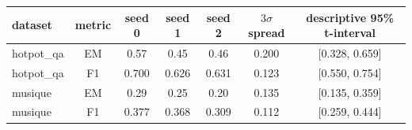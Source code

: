 \begin{tabular}{lcccccc}
\toprule
dataset & metric & seed 0 & seed 1 & seed 2 & $3\sigma$ spread & descriptive 95\% t-interval \\
\midrule
hotpot\_qa & EM & 0.57 & 0.45 & 0.46 & 0.200 & [0.328, 0.659] \\
hotpot\_qa & F1 & 0.700 & 0.626 & 0.631 & 0.123 & [0.550, 0.754] \\
musique & EM & 0.29 & 0.25 & 0.20 & 0.135 & [0.135, 0.359] \\
musique & F1 & 0.377 & 0.368 & 0.309 & 0.112 & [0.259, 0.444] \\
\bottomrule
\end{tabular}
